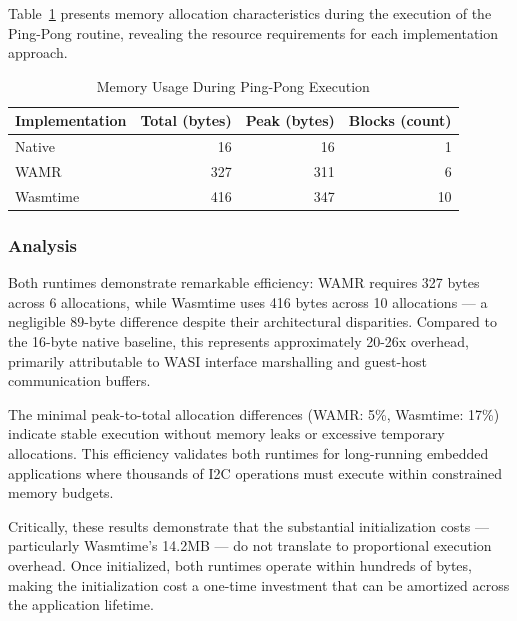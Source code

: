 Table~\ref{tab:memory-execution} presents memory allocation characteristics during the execution of the Ping-Pong routine, revealing the resource requirements for each implementation approach.

\begin{table}[H]
    \centering
    \caption{Memory Usage During Ping-Pong Execution}
    \label{tab:memory-execution}
    \begin{tabular}{lrrr}
        \toprule
        \textbf{Implementation} & \textbf{Total (bytes)} & \textbf{Peak (bytes)} & \textbf{Blocks (count)} \\
        \midrule
        Native        & 16   & 16  & 1 \\
        WAMR          & 327  & 311 & 6 \\
        Wasmtime      & 416  & 347 & 10 \\
        \bottomrule
    \end{tabular}
\end{table}

\subsubsection{Analysis}

Both runtimes demonstrate remarkable efficiency: WAMR requires 327 bytes across 6 allocations, while Wasmtime uses 416 bytes across 10 allocations --- a negligible 89-byte difference despite their architectural disparities. Compared to the 16-byte native baseline, this represents approximately 20-26x overhead, primarily attributable to WASI interface marshalling and guest-host communication buffers.

The minimal peak-to-total allocation differences (WAMR: 5\%, Wasmtime: 17\%) indicate stable execution without memory leaks or excessive temporary allocations. This efficiency validates both runtimes for long-running embedded applications where thousands of I2C operations must execute within constrained memory budgets.

Critically, these results demonstrate that the substantial initialization costs --- particularly Wasmtime's 14.2MB --- do not translate to proportional execution overhead. Once initialized, both runtimes operate within hundreds of bytes, making the initialization cost a one-time investment that can be amortized across the application lifetime.


